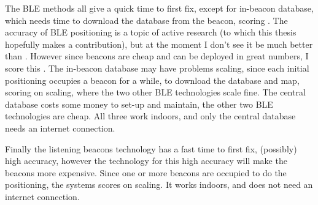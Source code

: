 The BLE methods all give a quick time to first fix, except for in-beacon database, which needs time to download the database from the beacon, scoring \maybe.
The accuracy of BLE positioning is a topic of active research (to which this thesis hopefully makes a contribution), but at the moment I don't see it be much better than \wifi.
However since beacons are cheap and can be deployed in great numbers, I score this \maybe.
The in-beacon database may have problems scaling, since each initial positioning occupies a beacon for a while, to download the database and map, scoring \maybe on scaling, where the two other BLE technologies scale fine.
The central database costs some money to set-up and maintain, the other two BLE technologies are cheap.
All three work indoors, and only the central database needs an internet connection.

Finally the listening beacons technology has a fast time to first fix, (possibly) high accuracy, however the technology for this high accuracy will make the beacons more expensive.
Since one or more beacons are occupied to do the positioning, the systems scores \maybe on scaling.
It works indoors, and does not need an internet connection.

